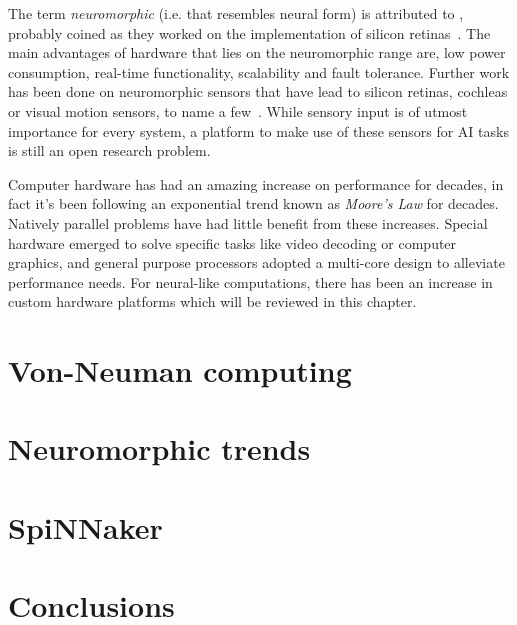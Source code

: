 The term \emph{neuromorphic} (i.e. that resembles neural form) is attributed to \citeauthor{mead2012analog}, probably coined as they worked on the implementation of silicon retinas~\cite{carver-mead,mead2012analog}. The main advantages of hardware that lies on the neuromorphic range are, low power consumption, real-time functionality, scalability and fault tolerance. Further work has been done on neuromorphic sensors that have lead to silicon retinas, cochleas or visual motion sensors, to name a few~\cite{liu2010neuromorphic}. While sensory input is of utmost importance for every system, a platform to make use of these sensors for AI tasks is still an open research problem. 

Computer hardware has had an amazing increase on performance for decades, in fact it's been following an exponential trend known as \emph{Moore's Law} for decades. Natively parallel problems have had little benefit from these increases. Special hardware emerged to solve specific tasks like video decoding or computer graphics, and general purpose processors adopted a multi-core design to alleviate performance needs. For neural-like computations, there has been an increase in custom hardware platforms which will be reviewed in this chapter.

\section{Von-Neuman computing}

\section{Neuromorphic trends}

\section{SpiNNaker}

%
\section{Conclusions}
